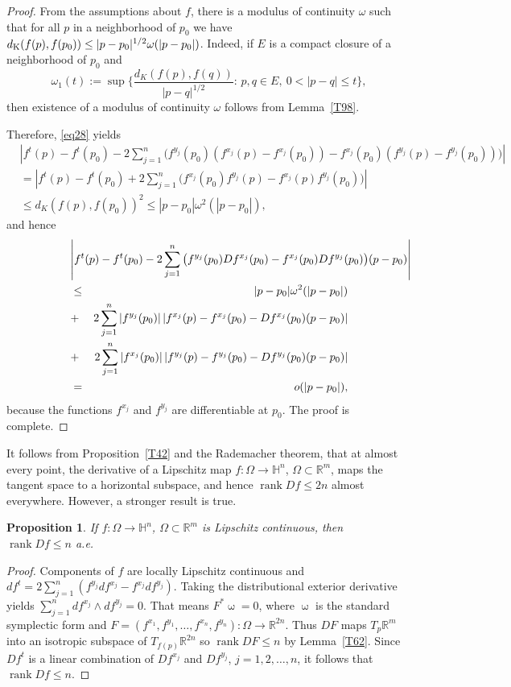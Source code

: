 \documentclass[intlimits,12pt,reqno]{amsart}
\newcommand{\bbbr}{\mathbb R}
\newcommand{\bbbh}{\mathbb H}
\newcommand{\R}{\mathbb R}
\numberwithin{equation}{section}
\newtheorem{proposition}[theorem]{Proposition}
\theoremstyle{definition}
\def\rank{\operatorname{rank}}
\begin{document}
\begin{proof}
From the assumptions about $f$, there is a 
modulus of continuity $\omega$ such that
for all $p$ in a neighborhood of $p_0$ we have
$d_{\rm{K}}(f(p),f(p_0))\leq |p-p_0|^{1/2}\omega(|p-p_0|)$.
Indeed, if $E$ is a compact closure of a neighborhood of $p_0$ and 
$$
\omega_1(t):=\sup\Bigg\{\frac{d_K(f(p),f(q))}{|p-q|^{1/2}}:\, p,q\in E,\ 0<|p-q|\leq t\Bigg\},
$$
then existence of a modulus of continuity $\omega$ follows from Lemma~\ref{T98}.


Therefore, \eqref{eq28} yields
\[
\begin{split}
&\left|
f^t(p)-f^t(p_0)-2\sum_{j=1}^n \big(f^{y_j}(p_0)(f^{x_j}(p)-f^{x_j}(p_0))-f^{x_j}(p_0)(f^{y_j}(p)-f^{y_j}(p_0))\big)
\right|\\
&=
\left|f^t(p)-f^t(p_0) + 2\sum_{j=1}^n
\big( f^{x_j}(p_0)f^{y_j}(p) - f^{x_j}(p)f^{y_j}(p_0)\big)\right|\\ 
& \leq 
d_K(f(p),f(p_0))^2\leq
|p-p_0|\omega^2(|p-p_0|),
\end{split}
\]
and hence
\begin{eqnarray*}
\lefteqn{\left| f^t(p)-f^t(p_0) - 
2\sum_{j=1}^n \big(f^{y_j}(p_0)Df^{x_j}(p_0) - f^{x_j}(p_0)Df^{y_j}(p_0)\big)(p-p_0)\right|} \\
& \leq &
|p-p_0|\omega^2(|p-p_0|) \\ 
& + &
2\sum_{j=1}^n |f^{y_j}(p_0)|\, |f^{x_j}(p)-f^{x_j}(p_0)-Df^{x_j}(p_0)(p-p_0)|\\
& + &
2\sum_{j=1}^n |f^{x_j}(p_0)|\, |f^{y_j}(p)-f^{y_j}(p_0)-Df^{y_j}(p_0)(p-p_0)|\\
& = &
o(|p-p_0|),
\end{eqnarray*}
because the functions $f^{x_j}$ and $f^{y_j}$ are differentiable at $p_0$. The proof is complete.
\end{proof}
It follows from Proposition~\ref{T42} and the Rademacher theorem, that at almost every point, the derivative of a Lipschitz map $f:\Omega\to\bbbh^n$, $\Omega\subset\bbbr^m$, maps the tangent space to a horizontal subspace, and hence $\operatorname{rank} Df\leq 2n$ almost everywhere. However, a stronger result is true.
\begin{proposition}
\label{T110}
If $f:\Omega\to\bbbh^n$, $\Omega\subset\R^m$ is Lipschitz continuous, then $\operatorname{rank} Df\leq n$ a.e.
\end{proposition}
\begin{proof}
Components of $f$ are locally Lipschitz continuous and
$df^t=2\sum_{j=1}^n(f^{y_j}df^{x_j}-f^{x_j}df^{y_j})$.
Taking the distributional exterior derivative yields
$\sum_{j=1}^n df^{x_j}\wedge df^{y_j}=0$.
That means $F^*\upomega=0$, where $\upomega$ is the standard symplectic form and
$F=(f^{x_1}, f^{y_1},\ldots,f^{x_n},f^{y_n}):\Omega\to\R^{2n}$.
Thus $DF$ maps $T_p\R^m$ into an isotropic subspace of $T_{f(p)}\R^{2n}$ so $\rank DF\leq n$ by Lemma~\ref{T62}. Since $Df^t$ is a linear combination of $Df^{x_j}$ and $Df^{y_j}$, $j=1,2,\ldots,n$, it follows that $\rank Df\leq n$.
\end{proof}
\end{document}
